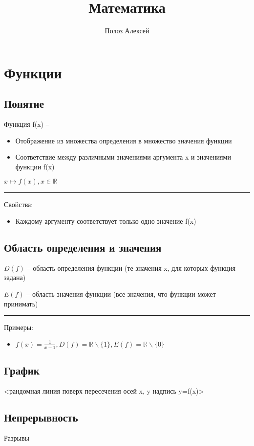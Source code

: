 \documentclass{article}
\title{Математика}
\author{Полоз Алексей}
\begin{document}
\maketitle

\section{Функции}
\subsection{Понятие}
Функция f(x) --
\begin{itemize}
    \item Отображение из множества определения в множество значения функции
    \item  Соответствие между различными значениями аргумента x и значениями функции f(x)
\end{itemize}

$x \mapsto f(x), x \in \mathbb{R}$ 


\noindent\rule{\textwidth}{1pt}

Свойства:
\begin{itemize}
    \item Каждому аргументу соответствует только одно значение f(x)
\end{itemize}


\subsection{Область определения и значения}
$D(f)$ -- область определения функции (те значения x, для которых функция задана)

$E(f)$ -- область значения функции (все значения, что функции может принимать)

\noindent\rule{\textwidth}{1pt}

Примеры:
\begin{itemize}
    \item $f(x)=\frac{1}{x-1}, D(f)=\mathbb{R}\backslash\{1\}, E(f)=\mathbb{R}\backslash\{0\}$
\end{itemize}


\subsection{График}
<рандомная линия поверх пересечения осей x, y надпись y=f(x)>


\subsection{Непрерывность}
Разрывы
\end{document}
